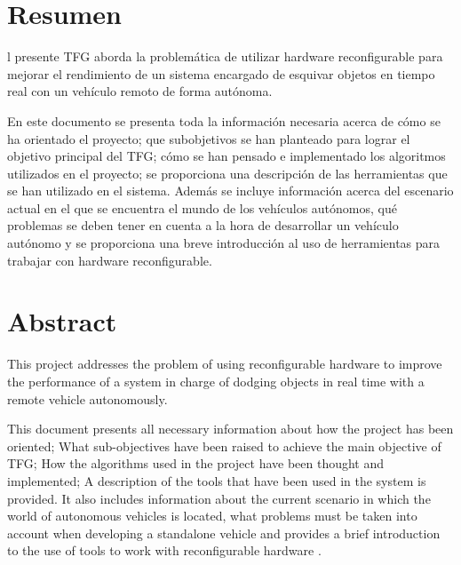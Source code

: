 \chapter{Resumen}

l presente \ac{TFG} aborda la problemática de utilizar hardware reconfigurable para mejorar el rendimiento de un sistema encargado de esquivar objetos en tiempo real con un vehículo remoto de forma autónoma. 

En este documento se presenta toda la información necesaria acerca de cómo se ha orientado el proyecto; que subobjetivos se han planteado para lograr el objetivo principal del \ac{TFG}; cómo se han pensado e implementado los algoritmos utilizados en el proyecto; se proporciona una descripción de las herramientas que se han utilizado en el sistema. Además se incluye información acerca del escenario actual en el que se encuentra el mundo de los vehículos autónomos, qué problemas se deben tener en cuenta a la hora de desarrollar un vehículo autónomo y se proporciona una breve introducción al uso de herramientas para trabajar con hardware reconfigurable.

\chapter{Abstract}

This project addresses the problem of using reconfigurable hardware to improve the performance of a system in charge of dodging objects in real time with a remote vehicle autonomously.

This document presents all necessary information about how the project has been oriented; What sub-objectives have been raised to achieve the main objective of \ac{TFG}; How the algorithms used in the project have been thought and implemented; A description of the tools that have been used in the system is provided. It also includes information about the current scenario in which the world of autonomous vehicles is located, what problems must be taken into account when developing a standalone vehicle and provides a brief introduction to the use of tools to work with reconfigurable hardware .
